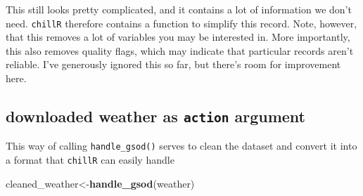 \documentclass[
]{book}
\newenvironment{Shaded}{\begin{snugshade}}{\end{snugshade}}
\newcommand{\DataTypeTok}[1]{\textcolor[rgb]{0.13,0.29,0.53}{#1}}
\newcommand{\DecValTok}[1]{\textcolor[rgb]{0.00,0.00,0.81}{#1}}
\newcommand{\KeywordTok}[1]{\textcolor[rgb]{0.13,0.29,0.53}{\textbf{#1}}}
\newcommand{\NormalTok}[1]{#1}
\newcommand{\OperatorTok}[1]{\textcolor[rgb]{0.81,0.36,0.00}{\textbf{#1}}}
\newcommand{\StringTok}[1]{\textcolor[rgb]{0.31,0.60,0.02}{#1}}
\begin{document}
This still looks pretty complicated, and it contains a lot of information we don't need. \texttt{chillR} therefore contains a function to simplify this record. Note, however, that this removes a lot of variables you may be interested in. More importantly, this also removes quality flags, which may indicate that particular records aren't reliable. I've generously ignored this so far, but there's room for improvement here.

\hypertarget{downloaded-weather-as-action-argument}{%
\subsection{\texorpdfstring{downloaded weather as \texttt{action} argument}{downloaded weather as action argument}}\label{downloaded-weather-as-action-argument}}

This way of calling \texttt{handle\_gsod()} serves to clean the dataset and convert it into a format that \texttt{chillR} can easily handle

\begin{Shaded}
\begin{Highlighting}[]
\NormalTok{cleaned_weather<-}\KeywordTok{handle_gsod}\NormalTok{(weather)}
\end{Highlighting}
\end{Shaded}

\begin{Shaded}
\end{Shaded}

\begingroup\fontsize{8}{10}\selectfont
\end{document}
